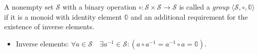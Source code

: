 \begin{definition}[A group]
A nonempty set $\mathcal{S}$ with a binary operation $\circ: {\mathcal{S}} \times {\mathcal{S}} \to {\mathcal{S}}$ is called a \emph{group} $\langle \mathcal{S}, \circ, \mathbb{0} \rangle$ if it is a monoid with identity element $\mathbb{0}$ and an additional requirement for the existence of inverse elements.
\begin{itemize}
\item Inverse elements: $ \forall a\in \mathcal{S}\quad \exists a^{-1}\in \mathcal{S}\colon (a \circ a^{-1}=a^{-1} \circ a = \mathbb{0})$.
\end{itemize}
\end{definition}

